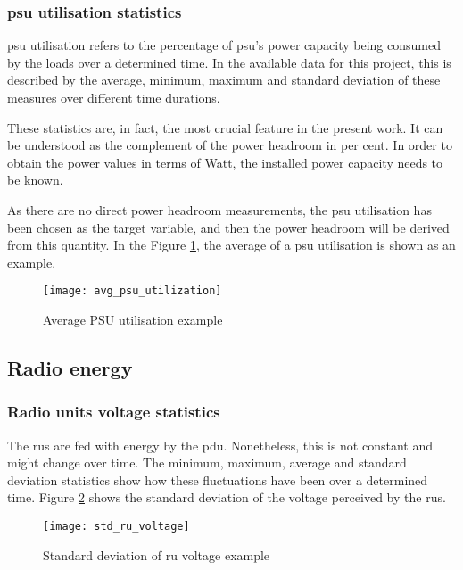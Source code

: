 \subsubsection*{\ac{psu} utilisation statistics}

\ac{psu} utilisation refers to the percentage of \ac{psu}'s power capacity being consumed by the loads over a determined time. In the available data for this project, this is described by the average, minimum, maximum and standard deviation of these measures over different time durations.

These statistics are, in fact, the most crucial feature in the present work. It can be understood as the complement of the power headroom in per cent. In order to obtain the power values in terms of Watt, the installed power capacity needs to be known. 

As there are no direct power headroom measurements, the \ac{psu} utilisation has been chosen as the target variable, and then the power headroom will be derived from this quantity. In the Figure \ref{fig:feats_avgpsu}, the average of a \ac{psu} utilisation is shown as an example. 

\begin{figure}[hptb]
	\centering
	\texttt{[image: avg\_psu\_utilization]}
	\caption{Average PSU utilisation example}
	\label{fig:feats_avgpsu}
\end{figure}


\subsection{Radio energy}

\subsubsection*{Radio units voltage statistics}

The \acp{ru} are fed with energy by the \ac{pdu}. Nonetheless, this is not constant and might change over time. The minimum, maximum, average and standard deviation statistics show how these fluctuations have been over a determined time. Figure \ref{fig:feats_std_ru_voltage} shows the standard deviation of the voltage perceived by the \acp{ru}. 

\begin{figure}[hptb]
	\centering
	\texttt{[image: std\_ru\_voltage]}
	\caption{Standard deviation of \ac{ru} voltage example}
	\label{fig:feats_std_ru_voltage}
\end{figure}

